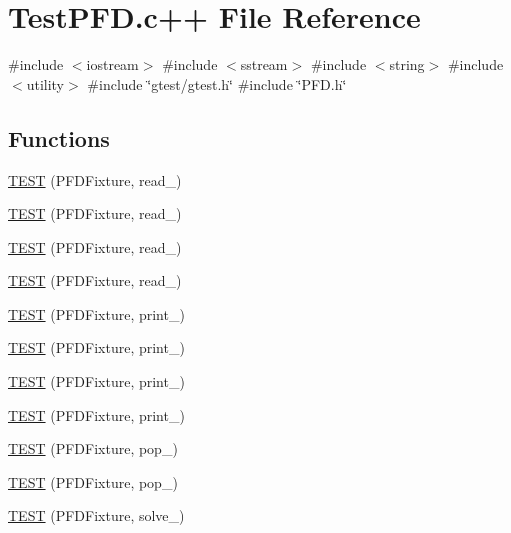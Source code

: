 \hypertarget{TestPFD_8c_09_09}{\section{\-Test\-P\-F\-D.\-c++ \-File \-Reference}
\label{TestPFD_8c_09_09}
}
{\ttfamily \#include $<$iostream$>$}\*
{\ttfamily \#include $<$sstream$>$}\*
{\ttfamily \#include $<$string$>$}\*
{\ttfamily \#include $<$utility$>$}\*
{\ttfamily \#include \char`\"{}gtest/gtest.\-h\char`\"{}}\*
{\ttfamily \#include \char`\"{}\-P\-F\-D.\-h\char`\"{}}\*
\subsection*{\-Functions}
\begin{DoxyCompactItemize}
\item 
\hyperlink{TestPFD_8c_09_09_ae2ceeb6270e4c46f9184f444c9a18803}{\-T\-E\-S\-T} (\-P\-F\-D\-Fixture, read\-\_)
\item 
\hyperlink{TestPFD_8c_09_09_a7cbb6f2592992b1e2738ac30bd9b3179}{\-T\-E\-S\-T} (\-P\-F\-D\-Fixture, read\-\_)
\item 
\hyperlink{TestPFD_8c_09_09_ad4d893008beebcf263d3cc3d02700f98}{\-T\-E\-S\-T} (\-P\-F\-D\-Fixture, read\-\_)
\item 
\hyperlink{TestPFD_8c_09_09_ae7f7279201c7c97347971bf054ba765d}{\-T\-E\-S\-T} (\-P\-F\-D\-Fixture, read\-\_)
\item 
\hyperlink{TestPFD_8c_09_09_aeb73c70e967605680ad0fd952404723a}{\-T\-E\-S\-T} (\-P\-F\-D\-Fixture, print\-\_)
\item 
\hyperlink{TestPFD_8c_09_09_a7f9a79749e850d18f5ce2dd840bcd811}{\-T\-E\-S\-T} (\-P\-F\-D\-Fixture, print\-\_)
\item 
\hyperlink{TestPFD_8c_09_09_a9e20949b00d611069dcdcdc5d2cb7f0d}{\-T\-E\-S\-T} (\-P\-F\-D\-Fixture, print\-\_)
\item 
\hyperlink{TestPFD_8c_09_09_ac6c604e5ae890ed3e0ed7889af41b5ea}{\-T\-E\-S\-T} (\-P\-F\-D\-Fixture, print\-\_)
\item 
\hyperlink{TestPFD_8c_09_09_ade50f9fc4d608fde50d8909b43827f8a}{\-T\-E\-S\-T} (\-P\-F\-D\-Fixture, pop\-\_)
\item 
\hyperlink{TestPFD_8c_09_09_a0b4d71afee9b5f508b8af4b891394835}{\-T\-E\-S\-T} (\-P\-F\-D\-Fixture, pop\-\_)
\item 
\hyperlink{TestPFD_8c_09_09_aa23a55abbaab38d30093f05880927102}{\-T\-E\-S\-T} (\-P\-F\-D\-Fixture, solve\-\_)
\item 

\end{DoxyCompactItemize}
